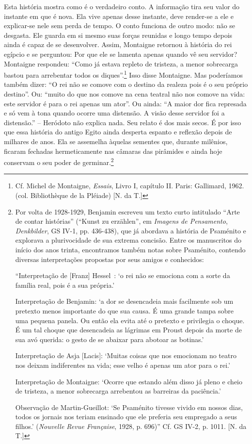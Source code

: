 Esta história mostra como é o verdadeiro conto. A informação tira seu
valor do instante em que é nova. Ela vive apenas desse instante, deve
render-se a ele e explicar-se nele sem perda de tempo. O conto funciona
de outro modo: não se desgasta. Ele guarda em si mesmo suas forças
reunidas e longo tempo depois ainda é capaz de se desenvolver. Assim,
Montaigne retornou à história do rei egípcio e se perguntou: Por que ele
se lamenta apenas quando vê seu servidor? Montaigne respondeu: ``Como já
estava repleto de tristeza, a menor sobrecarga bastou para arrebentar
todos os diques''.\footnote{Cf. Michel de Montaigne, \emph{Essais},
  Livro I, capítulo II. Paris: Gallimard, 1962. (col. Bibliothèque de la
  Pléiade) {[}N. da T.{]}} Isso disse Montaigne. Mas poderíamos também
dizer: ``O rei não se comove com o destino da realeza pois é o seu
próprio destino''. Ou: ``muito do que nos comove na cena teatral não nos
comove na vida: este servidor é para o rei apenas um ator''. Ou ainda:
``A maior dor fica represada e só vem à tona quando ocorre uma
distensão. A visão desse servidor foi a distensão.'' -- Heródoto não
explica nada. Seu relato é dos mais secos. É por isso que essa história
do antigo Egito ainda desperta espanto e reflexão depois de milhares de
anos. Ela se assemelha àquelas sementes que, durante milênios, ficaram
fechadas hermeticamente nas câmaras das pirâmides e ainda hoje conservam
o seu poder de germinar.\footnote{Por volta de 1928-1929, Benjamin
  escreveu um texto curto intitulado ``Arte de contar histórias''
  (``Kunst zu erzählen'', em \emph{Imagens de Pensamento},
  \emph{Denkbilder}, GS IV-1, pp. 436-438), que já abordava a história
  de Psaménito e explorava a plurivocidade de sua extrema concisão.
  Entre os manuscritos do início dos anos trinta, encontramos também
  notas sobre Psaménito, contendo diversas interpretações propostas por
  seus amigos e conhecidos:

  ``Interpretação de {[}Franz{]} Hessel~: `o rei não se emociona com a
  sorte da família real, pois é a sua própria.'

  Interpretação de Benjamin: `a dor se desencadeia mais facilmente sob
  um pretexto menos importante do que sua causa. É uma grande tampa
  sobre uma pequena panela. Ou então ela evita até o pretexto e
  privilegia o choque. É um tal choque que desencadeia as lágrimas em
  Proust depois da morte de sua avó querida: o gesto de se abaixar para
  abotoar as botinas.'

  Interpretação de Asja {[}Lacis{]}: `Muitas coisas que nos emocionam no
  teatro nos deixam indiferentes na vida; esse velho é apenas um ator
  para o rei.'

  Interpretação de Montaigne: `Ocorre que estando além disso já pleno e
  cheio de tristeza, a menor sobrecarga arrebentou as barreiras da
  paciência.'

  Observação de Martin-Gueillot: `Se Psaménito tivesse vivido em nossos
  dias, todos os jornais nos teriam ensinado que ele preferia seu
  empregado a seus filhos.' (\emph{Nouvelle Revue Française}, 1928, p.
  696)'' Cf. GS IV-2, p. 1011. {[}N. da T.{]}}

